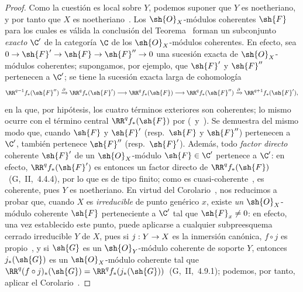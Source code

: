 \documentclass[oneside]{amsart}
\makeatletter
\newcommand{\ega@arrow}[2]{\mathchoice{#1}{#2}{#2}{#2}}
\renewcommand{\to}{\ega@arrow{\longrightarrow}{\rightarrow}}
\newcommand{\oldpage}[2][]{{\marginnote{\normalfont\textbf{#1}~|~#2}}\ignorespaces}
\makeatother
\begin{document}
\begin{proof}
Como la cuestión es local sobre $Y$, podemos suponer que $Y$ es noetheriano, y por tanto que $X$ es noetheriano~.
Los $\sh{O}_X$-módulos coherentes $\sh{F}$ para los cuales es válida la conclusión del Teorema~ forman un subconjunto \emph{exacto} $\C'$ de la categoría $\C$ de los $\sh{O}_X$-módulos coherentes.
\oldpage[III]{117}
En efecto, sea $0\to\sh{F}'\to\sh{F}\to\sh{F}''\to 0$ una sucesión exacta de $\sh{O}_X$-módulos coherentes; supongamos, por ejemplo, que $\sh{F}'$ y $\sh{F}''$ pertenecen a $\C'$; se tiene la sucesión exacta larga de cohomología
\[
  \RR^{q-1}f_*(\sh{F}'')\xrightarrow{\partial}\RR^q f_*(\sh{F}')\to\RR^q f_*(\sh{F})\to\RR^q f_*(\sh{F}'')\xrightarrow{\partial}\RR^{q+1}f_*(\sh{F}'),
\]
en la que, por hipótesis, los cuatro términos exteriores son coherentes; lo mismo ocurre con el término central $\RR^q f_*(\sh{F})$ por (~y~).
Se demuestra del mismo modo que, cuando $\sh{F}$ y $\sh{F}'$ (resp.~$\sh{F}$ y $\sh{F}''$) pertenecen a $\C'$, también pertenece $\sh{F}''$ (resp.~$\sh{F}'$).
Además, todo \emph{factor directo} coherente $\sh{F}'$ de un $\sh{O}_X$-módulo $\sh{F}\in\C'$ pertenece a $\C'$: en efecto, $\RR^q f_*(\sh{F}')$ es entonces un factor directo de $\RR^q f_*(\sh{F})$~(G,~II,~4.4.4), por lo que es de tipo finito; como es cuasi-coherente~, es coherente, pues $Y$ es noetheriano.
En virtud del Corolario~, nos reducimos a probar que, cuando $X$ es \emph{irreducible} de punto genérico $x$, existe \emph{un} $\sh{O}_X$-módulo coherente $\sh{F}$ perteneciente a $\C'$ tal que $\sh{F}_x\neq 0$: en efecto, una vez establecido este punto, puede aplicarse a cualquier subpreesquema cerrado irreducible $Y$ de $X$, pues si $j:Y\to X$ es la inmersión canónica, $f\circ j$ es propio~, y si $\sh{G}$ es un $\sh{O}_Y$-módulo coherente de soporte $Y$, entonces $j_*(\sh{G})$ es un $\sh{O}_X$-módulo coherente tal que $\RR^q(f\circ j)_*(\sh{G})=\RR^q f_*(j_*(\sh{G}))$~(G,~II,~4.9.1); podemos, por tanto, aplicar el Corolario~.


\end{proof}
\end{document}
